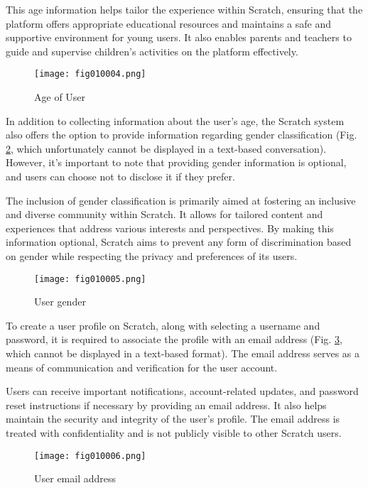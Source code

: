 This age information helps tailor the experience within Scratch, ensuring that the platform offers appropriate educational resources and maintains a safe and supportive environment for young users. It also enables parents and teachers to guide and supervise children's activities on the platform effectively.

\begin{figure}[H]
   \centering
   \texttt{[image: fig010004.png]}
   \caption{Age of User}
\label{fig010004}
\end{figure}

In addition to collecting information about the user's age, the Scratch system also offers the option to provide information regarding gender classification (Fig. \ref{fig010005}, which unfortunately cannot be displayed in a text-based conversation). However, it's important to note that providing gender information is optional, and users can choose not to disclose it if they prefer.

The inclusion of gender classification is primarily aimed at fostering an inclusive and diverse community within Scratch. It allows for tailored content and experiences that address various interests and perspectives. By making this information optional, Scratch aims to prevent any form of discrimination based on gender while respecting the privacy and preferences of its users.

\begin{figure}[H]
   \centering
   \texttt{[image: fig010005.png]}
   \caption{User gender}
\label{fig010005}
\end{figure}

To create a user profile on Scratch, along with selecting a username and password, it is required to associate the profile with an email address (Fig. \ref{fig010006}, which cannot be displayed in a text-based format). The email address serves as a means of communication and verification for the user account.

Users can receive important notifications, account-related updates, and password reset instructions if necessary by providing an email address. It also helps maintain the security and integrity of the user's profile. The email address is treated with confidentiality and is not publicly visible to other Scratch users.

\begin{figure}[H]
   \centering
   \texttt{[image: fig010006.png]}
   \caption{User email address}
\label{fig010006}
\end{figure}

